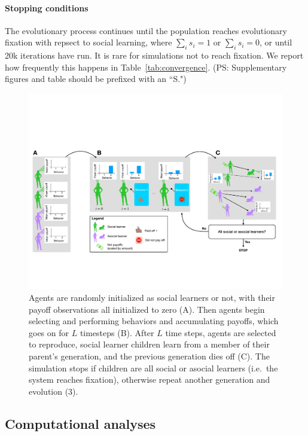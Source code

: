 \documentclass[letterpaper,11.5pt]{scrartcl}
\newcommand{\ps}[1]{{\textcolor{mygreen} {({\tiny PS:} #1)}}}
\begin{document}
\paragraph{Stopping conditions} The evolutionary process continues until the
population reaches evolutionary fixation with repsect to social learning, where
$\sum_i s_i = 1$ or $\sum_i s_i = 0$, or until 20k iterations have run. 
It is rare for simulations not to reach fixation. We report how frequently
this happens in Table~\ref{tab:convergence}. \ps{Supplementary figures and table should be prefixed with an ``S."}

\clearpage

\begin{figure}
  \caption{Agents are randomly initialized as social learners or not, with their
  payoff observations all initialized to zero (A). Then agents begin selecting
and performing behaviors and accumulating payoffs, which goes on for $L$
timesteps (B). After $L$ time steps, agents are selected to reproduce,
social learner children learn from a member of their parent's generation, and
the previous generation dies off (C). The simulation stops if children are all
social or asocial learners (i.e.\ the system reaches fixation), 
otherwise repeat another generation and evolution (3).}
  \label{fig:schematic}
  \centering
    \includegraphics[width=\textwidth]{Figures/IntraInterGenerationalDynamics.pdf}
\end{figure}


\subsection{Computational analyses}
\label{ssec:computationalAnalyses}
\end{document}
